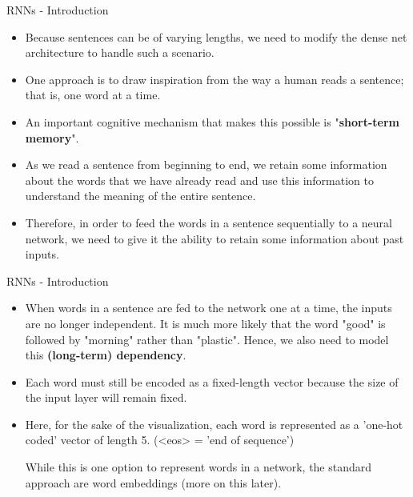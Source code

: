 \begin{frame} {RNNs - Introduction}
  \begin{itemize}
    \item Because sentences can be of varying lengths, we need to modify the dense net architecture to handle such a scenario.
    \item One approach is to draw inspiration from the way a human reads a sentence; that is, one word at a time.
    \item An important cognitive mechanism that makes this possible is "\textbf{short-term memory}".
    \item As we read a sentence from beginning to end, we retain some information about the words that we have already read and use this information to understand the meaning of the entire sentence.
    \item Therefore, in order to feed the words in a sentence sequentially to a neural network, we need to give it the ability to retain some information about past inputs.
  \end{itemize}
\end{frame}
 
\begin{frame} {RNNs - Introduction}
  \begin{itemize}
   \item %
    When words in a sentence are fed to the network one at a time, the inputs are no longer independent. It is much more likely that the word "good" is followed by "morning" rather than "plastic". Hence, we also need to model this \textbf{(long-term) dependency}. 
    \item %
    Each word must still be encoded as a fixed-length vector because the size of the input layer will remain fixed.
    \item Here, for the sake of the visualization, each word is represented as a 'one-hot coded' vector of length 5. (<eos> = 'end of sequence')
    \begin{figure}
      \centering
  \end{figure}
    While this is one option to represent words in a network, the standard approach are word embeddings (more on this later).
  \end{itemize}
\end{frame}

